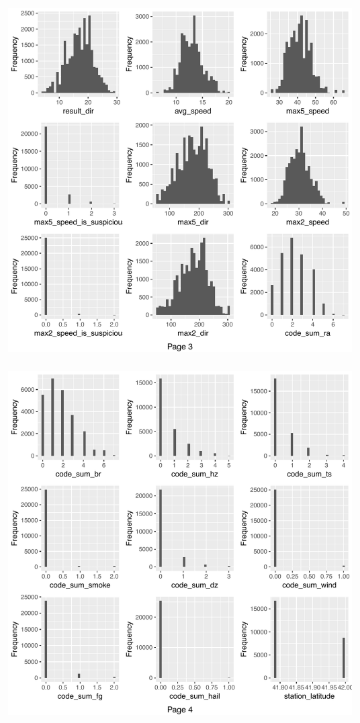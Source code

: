 \begin{figure}[H]
	\ContinuedFloat 
	\begin{subfigure}[t]{0.49\textwidth}
		\includegraphics[width=\textwidth]{images/ml/plot_histogram3}
	\end{subfigure}
	\begin{subfigure}[t]{0.49\textwidth}
		\includegraphics[width=\textwidth]{images/ml/plot_histogram4}
	\end{subfigure}
\end{figure}
